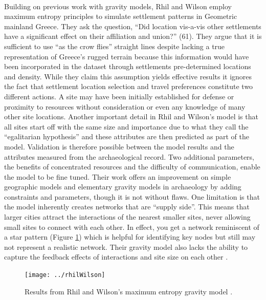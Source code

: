 \documentclass[12pt,a4paper]{thesis}
\begin{document}
\paragraph{}
Building on previous work with gravity models, Rhil and Wilson \citeyearpar{RihWil91} employ maximum entropy principles to simulate settlement patterns in Geometric mainland Greece. They ask the question, ``Did location vis-a-vis other settlements have a significant effect on their affiliation and union?'' (61). They argue that it is sufficient to use ``as the crow flies'' straight lines despite lacking a true representation of Greece's rugged terrain because this information would have been incorporated in the dataset through settlements pre-determined locations and density. While they claim this assumption yields effective results it ignores the fact that settlement location selection and travel preferences constitute two different actions. A site may have been initially established for defense or proximity to resources without consideration or even any knowledge of many other site locations. Another important detail in Rhil and Wilson's model is that all sites start off with the same size and importance due to what they call the ``egalitarian hypothesis'' and these attributes are then predicted as part of the model. Validation is therefore possible between the model results and the attributes measured from the archaeological record. Two additional parameters, the benefits of concentrated resources and the difficulty of communication, enable the model to be fine tuned.   Their work offers an improvement on simple geographic models and elementary gravity models in archaeology by adding constraints and parameters, though it is not without flaws.  One limitation is that the model inherently creates networks that are ``supply side''. This means that larger cities attract the interactions of the nearest smaller sites, never allowing small sites to connect with each other. In effect, you get a network reminiscent of a star pattern (Figure \ref{fig:rhilWilson}) which is helpful for identifying key nodes but still may not represent a realistic network. Their gravity model also lacks the ability to capture the feedback effects of interactions and site size on each other \cite[10]{KnaEvaRiv08}.

\begin{figure}
\centering
\texttt{[image: ../rhilWilson]}
\caption[Results from Rhil and Wilson's maximum entropy gravity model]{Results from Rhil and Wilson's maximum entropy gravity model \citep{RihWil91}.}
\label{fig:rhilWilson}
\end{figure}
\end{document}

